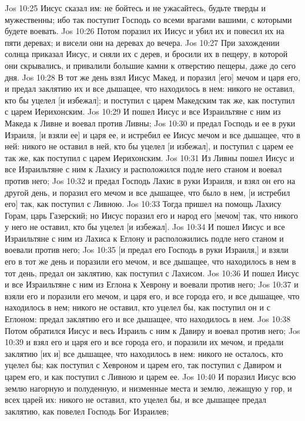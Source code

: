 \vs Jos 10:25 Иисус сказал им: не бойтесь и не ужасайтесь, будьте тверды и мужественны; ибо так поступит Господь со всеми врагами вашими, с которыми будете воевать.
\vs Jos 10:26 Потом поразил их Иисус и убил их и повесил их на пяти деревах; и висели они на деревах до вечера.
\vs Jos 10:27 При захождении солнца приказал Иисус, и сняли их с дерев, и бросили их в пещеру, в которой они скрывались, и привалили большие камни к отверстию пещеры,  даже до сего дня.
\vs Jos 10:28 В тот же день взял Иисус Макед, и поразил [его] мечом и царя его, и предал заклятию их и все дышащее, что находилось в нем: никого не оставил, кто бы уцелел [и избежал]; и поступил с царем Македским так же, как поступил с царем Иерихонским.
\vs Jos 10:29 И пошел Иисус и все Израильтяне с ним из Македа к Ливне и воевал против Ливны;
\vs Jos 10:30 и предал Господь и ее в руки Израиля, [и взяли ее] и царя ее, и истребил ее Иисус мечом и все дышащее, что  в ней: никого не оставил в ней, кто бы уцелел [и избежал], и поступил с царем ее так же, как поступил с царем Иерихонским.
\vs Jos 10:31 Из Ливны пошел Иисус и все Израильтяне с ним к Лахису и расположился подле него станом и воевал против него;
\vs Jos 10:32 и предал Господь Лахис в руки Израиля, и взял он его на другой день, и поразил его мечом и все дышащее, что было в нем, [и истребил его] так, как поступил с Ливною.
\vs Jos 10:33 Тогда пришел на помощь Лахису Горам, царь Газерский; но Иисус поразил его и народ его [мечом] так, что никого у него не оставил, кто бы уцелел [и избежал].
\vs Jos 10:34 И пошел Иисус и все Израильтяне с ним из Лахиса к Еглону и расположились подле него станом и воевали против него;
\vs Jos 10:35 [и предал его Господь в руки Израиля,] и взяли его в тот же день и поразили его мечом, и все дышащее, что находилось в нем в тот день, предал он заклятию, как поступил с Лахисом.
\vs Jos 10:36 И пошел Иисус и все Израильтяне с ним из Еглона к Хеврону и воевали против него;
\vs Jos 10:37 и взяли его и поразили его мечом, и царя его, и все города его, и все дышащее, что находилось в нем; никого не оставил, кто уцелел бы, как поступил он и с Еглоном: предал заклятию его и все дышащее, что находилось в нем.
\vs Jos 10:38 Потом обратился Иисус и весь Израиль с ним к Давиру и воевал против него;
\vs Jos 10:39 и взял его и царя его и все города его, и поразили их мечом, и предали заклятию [их и] все дышащее, что находилось в нем: никого не осталось, кто уцелел бы; как поступил с Хевроном и царем его, так поступил с Давиром и царем его, и как поступил с Ливною и царем ее.
\vs Jos 10:40 И поразил Иисус всю землю нагорную и полуденную, и низменные места и землю, лежащую у гор, и всех царей их: никого не оставил, кто уцелел бы, и все дышащее предал заклятию, как повелел Господь Бог Израилев;
